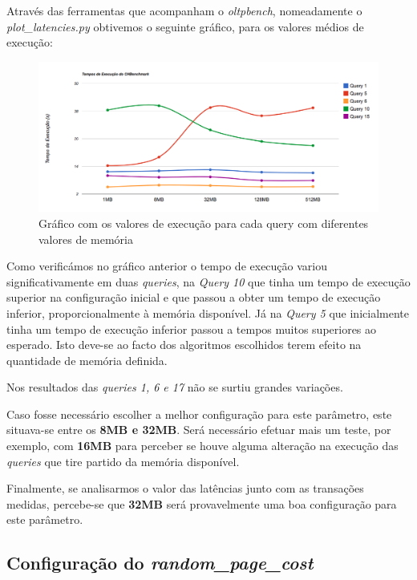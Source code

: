 Através das ferramentas que acompanham o \textit{oltpbench}, nomeadamente o \textit{plot\_latencies.py} obtivemos o seguinte gráfico, para os valores médios de execução:

\begin{figure}[ht!]
\centering
\includegraphics[width=\textwidth]{img/06_wm_c.png}
\caption{Gráfico com os valores de execução para cada query com diferentes valores de memória\label{overflow}}
\end{figure}

Como verificámos no gráfico anterior o tempo de execução variou significativamente em duas \textit{queries}, na \textit{Query 10} que tinha um tempo de execução superior na configuração inicial e que passou a obter um tempo de execução inferior, proporcionalmente à memória disponível. Já na \textit{Query 5} que inicialmente tinha um tempo de execução inferior passou a tempos muitos superiores ao esperado. Isto deve-se ao facto dos algoritmos escolhidos terem efeito na quantidade de memória definida.

Nos resultados das \textit{queries 1, 6 e 17} não se surtiu grandes variações.

Caso fosse necessário escolher a melhor configuração para este parâmetro, este situava-se entre os \textbf{8MB e 32MB}. Será necessário efetuar mais um teste, por exemplo, com \textbf{16MB} para perceber se houve alguma alteração na execução das \textit{queries} que tire partido da memória disponível.

Finalmente, se analisarmos o valor das latências junto com as transações medidas, percebe-se que \textbf{32MB} será provavelmente uma boa configuração para este parâmetro.


\subsection{Configuração do \textit{random\_page\_cost}}

